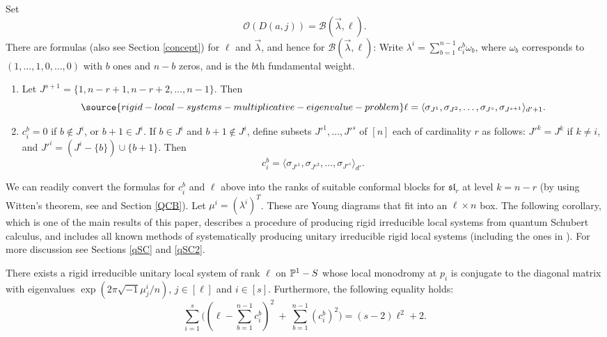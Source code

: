 Set $$\mathcal{O}(D(a,j))=\mathcal{B}(\vec{\lambda},\ell).$$
There are formulas (also see Section \ref{concept}) for $\ell$ and $\vec{\lambda}$, and hence for $\mathcal{B}(\vec{\lambda},\ell)$:
Write $\lambda^i=\sum_{b=1}^{n-1} c_{i}^b\omega_b$, where $\omega_b$ corresponds to $(1,\dots,1,0,\dots,0)$ with $b$ ones and $n-b$ zeros, and is the $b$th fundamental weight.
\begin{theorem}
\notready\label{brahms}

\begin{enumerate}
\item Let $J^{s+1}=\{1,n-r+1,n-r+2,\dots,n-1\}$. Then
\begin{equation}\label{formulel}
\source{rigid-local-systems-multiplicative-eigenvalue-problem}
\ell=\langle\sigma_{J^1}, \sigma_{J^2},\dots,\sigma_{J^s},\sigma_{J^{s+1}}\rangle_{d'+1}.
\end{equation}
\item $c_{i}^{b}=0$ if $b\not\in J^i$, or $b+1\in J^i$. If $b\in J^i$ and $b+1\not\in J^i$, define subsets $J'^1,\dots,J'^s$ of $[n]$
 each of cardinality $r$ as follows: $J'^k=J^k$ if $k\neq i$, and $J'^i=(J^i-\{b\})\cup \{b+1\}$. Then
$$c_i^{b}= \langle\sigma_{J'^1}, \sigma_{J'^2},\dots,\sigma_{J'^s}\rangle_{d'}.$$
\end{enumerate}
\end{theorem}
We can readily convert the formulas for $c_i^b$ and $\ell$ above into the ranks of suitable conformal blocks for $\mathfrak{sl}_r$  at level $k=n-r$ (by using Witten's theorem, see \cite[Proposition 3.4]{BHorn} and Section \ref{QCB}).
Let $\mu^i=(\lambda^i)^T$. These are Young diagrams that fit into an $\ell\times n$ box. The following corollary, which is one of the main results of this paper, describes a procedure of producing rigid irreducible local systems from quantum Schubert calculus, and includes all known methods of systematically producing unitary irreducible rigid local systems (including the ones in \cite{BH,Haraoka}). For more
discussion see Sections \ref{qSC} and \ref{qSC2}.
\begin{corollary}
\notready\label{existence}
There exists a rigid irreducible unitary local system of rank $\ell$ on $\Bbb{P}^1-S$ whose local monodromy at $p_i$ is conjugate to the diagonal matrix with eigenvalues  $\exp(2\pi\sqrt{-1}\mu_j^i/n)$, $j\in[\ell]$ and $i\in[s]$. Furthermore, the following  equality holds:
  $$\sum_{i=1}^s \bigl((\ell-\sum_{b=1}^{n-1} c^b_i)^2 \ + \ \sum_{b=1}^{n-1}(c^b_i)^2\bigr)=(s-2)\ell^2+2.$$
\end{corollary}
